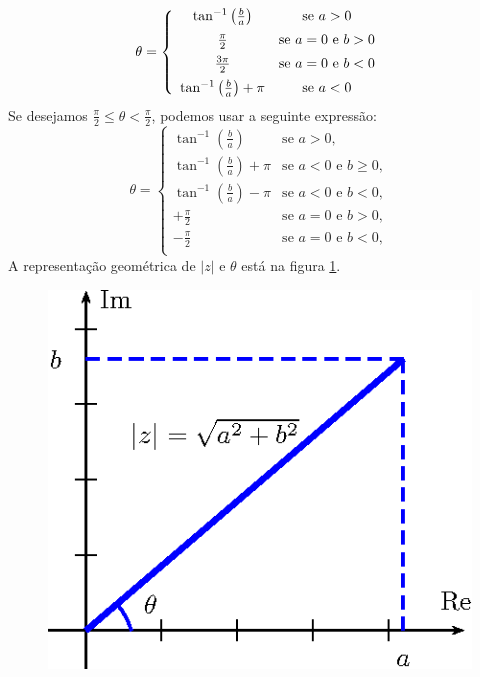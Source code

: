 \begin{equation}
\theta=\left\{\begin{array}{cc}\tan^{-1}\left(\frac{b}{a}\right)&\hbox{se}\ a>0\\[5pt]
\frac{\pi}{2}&\hbox{se}\ a=0\ \hbox{e}\ b>0\\[5pt]
\frac{3\pi}{2}&\hbox{se}\ a=0\ \hbox{e}\ b<0 \\[5pt] 
\tan^{-1}\left(\frac{b}{a}\right)+\pi&\hbox{se}\ a<0\end{array}\right.
\end{equation}
Se desejamos $\frac{\pi}{2}\leq \theta < \frac{\pi}{2}$, podemos usar a seguinte expressão:
\begin{equation}\theta=\begin{cases}
\tan^{-1}(\frac b a) &\text{se } a > 0, \\[5pt]
\tan^{-1}(\frac b a) + \pi &\text{se } a < 0 \text{ e } b \ge 0, \\[5pt]
\tan^{-1}(\frac b a) - \pi &\text{se } a < 0 \text{ e } b < 0, \\[5pt]
+\frac{\pi}{2} &\text{se } a = 0 \text{ e } b > 0, \\[5pt]
-\frac{\pi}{2} &\text{se } a = 0 \text{ e } b < 0, \\[5pt]
\end{cases}\end{equation}
A representação geométrica de $|z|$ e $\theta$ está na figura \ref{num_complexo}.
\begin{figure}[!ht]
\begin{center}

\includegraphics{cap_num_complexos/pics/figura_1}\end{center}
\caption{\label{num_complexo}}
\end{figure}
